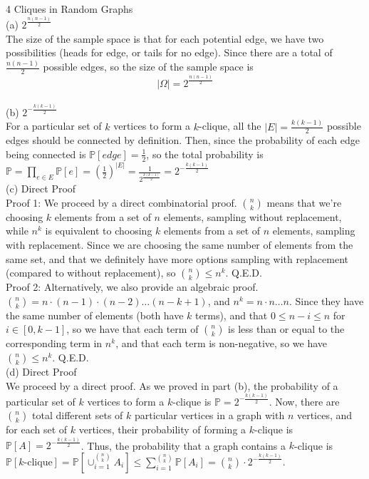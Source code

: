 \documentclass{article}
\begin{document}
{\Large 4 Cliques in Random Graphs} \\[.5cm]
{\color{red} (a) $2^{\frac{n(n-1)}{2}}$ } \\

The size of the sample space is that for each potential edge, we have two possibilities (heads for edge, or tails for no edge). Since there are a total of $\frac{n(n-1)}{2}$ possible edges, so the size of the sample space is $$|\Omega| = 2^{\frac{n(n-1)}{2}}$$ \\[.5cm]
{\color{red} (b) $2^{-\frac{k(k-1)}{2}}$ } \\

For a particular set of $k$ vertices to form a $k$-clique, all the $|E| = \frac{k(k-1)}{2}$ possible edges should be connected by definition. Then, since the probability of each edge being connected is $\mathbb{P}[edge] = \frac{1}{2}$, so the total probability is
$\mathbb{P} = \prod\limits_{e\in E} \mathbb{P}[e] = (\frac{1}{2})^{|E|} = \frac{1}{2^{\frac{k(k-1)}{2}}} = 2^{-\frac{k(k-1)}{2}}$\\[.5cm]
{\color{red} (c) Direct Proof } \\

Proof 1: We proceed by a direct combinatorial proof. $\binom{n}{k}$ means that we're choosing $k$ elements from a set of $n$ elements, sampling without replacement, while $n^k$ is equivalent to choosing $k$ elements from a set of $n$ elements, sampling with replacement. Since we are choosing the same number of elements from the same set, and that we definitely have more options sampling with replacement (compared to without replacement), so $\binom{n}{k} \leq n^k$. Q.E.D. \\

Proof 2: Alternatively, we also provide an algebraic proof. $\binom{n}{k} = n\cdot(n-1)\cdot(n-2)\dots(n-k+1)$, and $n^k = n\cdot n\dots n$. Since they have the same number of elements (both have $k$ terms), and that $0\leq n-i\leq n$ for $i\in[0,k-1]$, so we have that each term of $\binom{n}{k}$ is less than or equal to the corresponding term in $n^k$, and that each term is non-negative, so we have $\binom{n}{k} \leq n^k$. Q.E.D. \\[.5cm]
{\color{red} (d) Direct Proof } \\

We proceed by a direct proof. As we proved in part (b), the probability of a particular set of $k$ vertices to form a $k$-clique is $\mathbb{P} = 2^{-\frac{k(k-1)}{2}}$. Now, there are $\binom{n}{k}$ total different sets of $k$ particular vertices in a graph with $n$ vertices, and for each set of $k$ vertices, their probability of forming a $k$-clique is $\mathbb{P}[A] = 2^{-\frac{k(k-1)}{2}}$.
Thus, the probability that a graph contains a $k$-clique is $\mathbb{P}[k\text{-clique}] =
\mathbb{P}[\cup_{i=1}^{\binom{n}{k}} A_i] \leq
\sum\limits_{i=1}^{\binom{n}{k}} \mathbb{P}[A_i] = 
\binom{n}{k}\cdot 2^{-\frac{k(k-1)}{2}}$. \\
\end{document}
